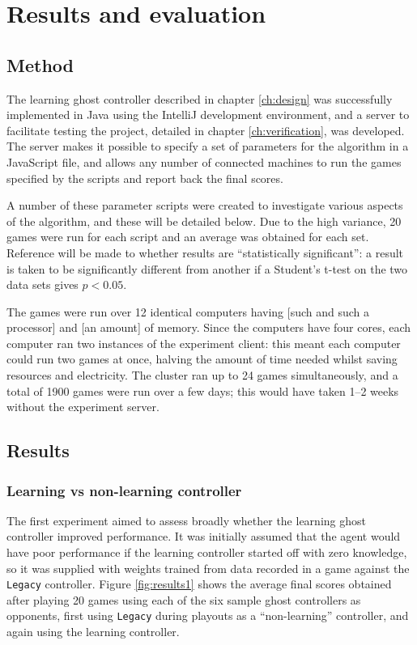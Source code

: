\chapter{Results and evaluation}
\label{ch:results}

\section{Method}

The learning ghost controller described in chapter \ref{ch:design} was successfully implemented in Java using the IntelliJ development environment, and a server to facilitate testing the project, detailed in chapter \ref{ch:verification}, was developed.  The server makes it possible to specify a set of parameters for the algorithm in a JavaScript file, and allows any number of connected machines to run the games specified by the scripts and report back the final scores.

A number of these parameter scripts were created to investigate various aspects of the algorithm, and these will be detailed below.  Due to the high variance, 20 games were run for each script and an average was obtained for each set.  Reference will be made to whether results are ``statistically significant'': a result is taken to be significantly different from another if a Student's t-test on the two data sets gives $p < 0.05$.

The games were run over 12 identical computers having [such and such a processor] and [an amount] of memory.  Since the computers have four cores, each computer ran two instances of the experiment client: this meant each computer could run two games at once, halving the amount of time needed whilst saving resources and electricity.  The cluster ran up to 24 games simultaneously, and a total of 1900 games were run over a few days; this would have taken 1--2 weeks without the experiment server.

\section{Results}

\subsection{Learning vs non-learning controller}

The first experiment aimed to assess broadly whether the learning ghost controller improved performance.  It was initially assumed that the agent would have poor performance if the learning controller started off with zero knowledge, so it was supplied with weights trained from data recorded in a game against the {\tt Legacy} controller.  Figure \ref{fig:results1} shows the average final scores obtained after playing 20 games using each of the six sample ghost controllers as opponents, first using {\tt Legacy} during playouts as a ``non-learning'' controller, and again using the learning controller.

